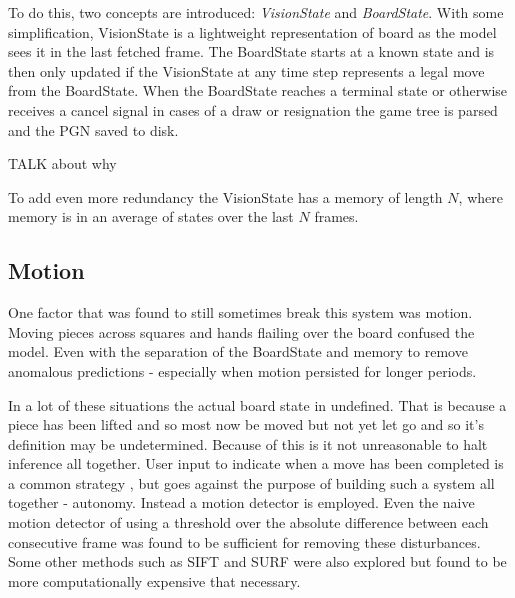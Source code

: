 To do this, two concepts are introduced: \textit{VisionState} and \textit{BoardState}.  With some simplification, VisionState is a lightweight 
representation of board as the model sees it in the last fetched frame.  The BoardState starts at a known state and is then only updated if the VisionState at 
any time step represents a legal move from the BoardState. When the BoardState reaches a terminal state or otherwise receives a cancel signal in cases of a 
draw or resignation the game tree is parsed and the PGN saved to disk.

TALK about why

To add even more redundancy the VisionState has a memory of length $N$, where memory is in an average of states over the last $N$ frames.

\subsection{Motion}
One factor that was found to still sometimes break this system was motion.  Moving pieces across squares and hands flailing over the board confused the
model.  Even with the separation of the BoardState and memory to remove anomalous predictions - especially when motion persisted for longer periods.  

In a lot of these situations the actual board state in undefined.  That is because a piece has been lifted and so most now be moved but not yet let go 
and so it's definition may be undetermined.  Because of this is it not unreasonable to halt inference all together.  User input to indicate when a move
has been completed is a common strategy \cite{}, but goes against the purpose of building such a system all together - autonomy.  Instead a motion detector is 
employed.  Even the naive motion detector of using a threshold over the absolute difference between each consecutive frame was found to be sufficient for removing these
disturbances.  Some other methods such as SIFT and SURF were also explored but found to be more computationally expensive that necessary.
